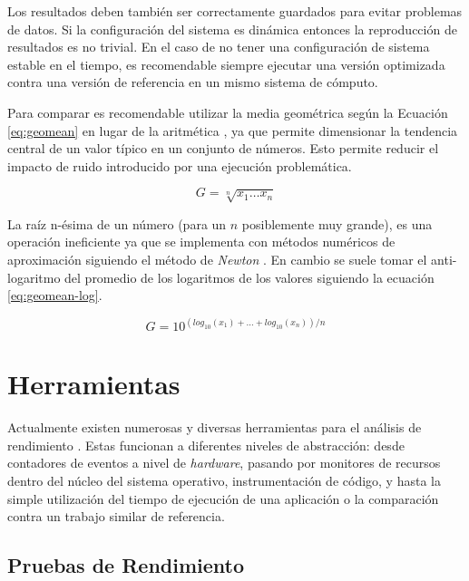 \documentclass[a4paper]{report}
\begin{document}
Los resultados deben también ser correctamente guardados para evitar problemas de datos. Si la configuración del sistema es dinámica entonces la
reproducción de resultados es no trivial. En el caso de no tener una configuración de sistema estable en el tiempo, es recomendable siempre
ejecutar una versión optimizada contra una versión de referencia en un mismo sistema de cómputo.

\bigskip

Para comparar es recomendable utilizar la media geométrica según la Ecuación \ref{eq:geomean} en lugar de la aritmética \cite{how-not-to-lie}, ya que permite dimensionar la tendencia central de un valor típico en un conjunto de números. Esto permite reducir el impacto de ruido introducido por una ejecución problemática.

\begin{equation}
\label{eq:geomean}
G = \sqrt[n]{x_{1} \ldots x_{n}}
\end{equation}

La raíz n-ésima de un número (para un $ n $ posiblemente muy grande), es una operación ineficiente ya que se implementa con métodos numéricos de aproximación siguiendo el método de {\it Newton} \cite{numerical-analysis}. En cambio se suele tomar el anti-logaritmo del promedio de los logaritmos de los valores siguiendo la ecuación \ref{eq:geomean-log}.

\begin{equation}
\label{eq:geomean-log}
G = 10 ^{( log _{10} (x_{1}) + \ldots + log _{10} (x_{n}) ) / n}
\end{equation}

\section{Herramientas}

Actualmente existen numerosas y diversas herramientas para el análisis de rendimiento \cite{gregg}. Estas funcionan a diferentes niveles de abstracción: desde contadores de eventos a nivel de {\it hardware}, pasando por monitores de recursos dentro del núcleo del sistema operativo, instrumentación de código, y hasta la simple utilización del tiempo de ejecución de una aplicación o la comparación contra un trabajo similar de referencia. 

\subsection{Pruebas de Rendimiento}
\end{document}
